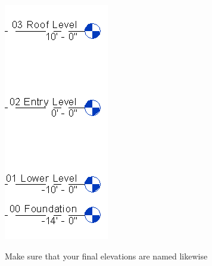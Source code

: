 \documentclass{tufte-book} %
\begin{document}
\begin{enumerate}
	\begin{marginfigure}
		\includegraphics[width=\linewidth]{revitelevationsname.png}
		\caption{Make sure that your final elevations are named likewise}
		\label{fig:revelevname}
	\end{marginfigure}
	

\end{enumerate}
\end{document}
